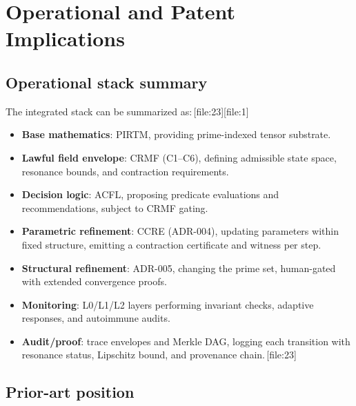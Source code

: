 \documentclass[11pt]{article}
\begin{document}
\section{Operational and Patent Implications}

\subsection{Operational stack summary}

The integrated stack can be summarized as:\,[file:23][file:1]
\begin{itemize}[leftmargin=1.5em]
  \item \textbf{Base mathematics}: PIRTM, providing prime-indexed tensor substrate.
  \item \textbf{Lawful field envelope}: CRMF (C1--C6), defining admissible state space, resonance bounds, and contraction requirements.
  \item \textbf{Decision logic}: ACFL, proposing predicate evaluations and recommendations, subject to CRMF gating.
  \item \textbf{Parametric refinement}: CCRE (ADR-004), updating parameters within fixed structure, emitting a contraction certificate and witness per step.
  \item \textbf{Structural refinement}: ADR-005, changing the prime set, human-gated with extended convergence proofs.
  \item \textbf{Monitoring}: L0/L1/L2 layers performing invariant checks, adaptive responses, and autoimmune audits.
  \item \textbf{Audit/proof}: trace envelopes and Merkle DAG, logging each transition with resonance status, Lipschitz bound, and provenance chain.\,[file:23]
\end{itemize}

\subsection{Prior-art position}
\end{document}
